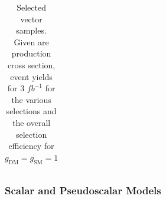 \begin{table}[h]
\begin{tabular}{lllllll}
\hline
\end{tabular}
\caption{Selected vector samples. Given are production cross section, event yields for 3 $fb^{-1 }$ for the various selections and the overall selection efficiency for $g_\textrm{DM}=g_\textrm{SM}=1$}
\label{tab:dm_V_g1_3fb}
\end{table}




\clearpage
\subsubsection{Scalar and Pseudoscalar Models} \label{sec:dm_pscalar}

